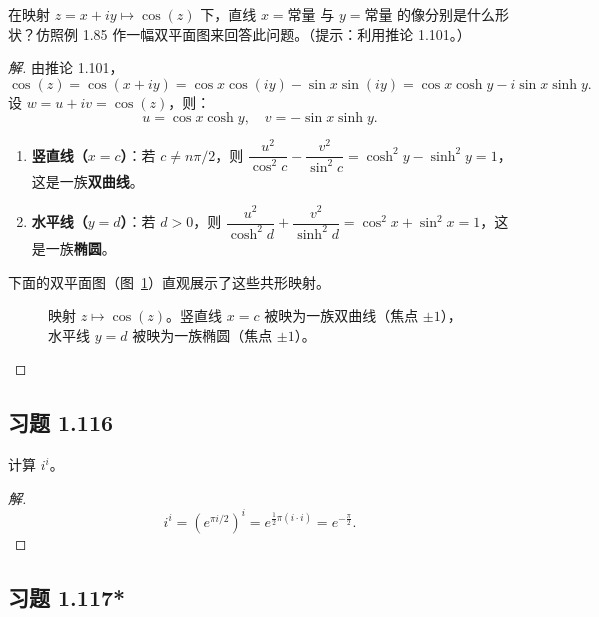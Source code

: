 \documentclass[11pt,a4paper]{article}
\theoremstyle{definition}
\newenvironment{solution}{\begin{proof}[解]}{\end{proof}}
\begin{document}
在映射 $z = x + iy \mapsto \cos(z)$ 下，直线 $x = \text{常量}$ 与 $y = \text{常量}$ 的像分别是什么形状？仿照例 1.85 作一幅双平面图来回答此问题。（提示：利用推论 1.101。）

\begin{solution}
由推论 1.101，
\[
  \cos(z) = \cos(x + iy) = \cos x \cos(iy) - \sin x \sin(iy) = \cos x \cosh y - i \sin x \sinh y.
\]
设 $w = u + iv = \cos(z)$，则：
\[
  u = \cos x \cosh y, \quad v = -\sin x \sinh y.
\]

\begin{enumerate}
  \item \textbf{竖直线（$x = c$）}：若 $c \neq n\pi/2$，则 $\dfrac{u^2}{\cos^2 c} - \dfrac{v^2}{\sin^2 c} = \cosh^2 y - \sinh^2 y = 1$，这是一族\textbf{双曲线}。
  \item \textbf{水平线（$y = d$）}：若 $d > 0$，则 $\dfrac{u^2}{\cosh^2 d} + \dfrac{v^2}{\sinh^2 d} = \cos^2 x + \sin^2 x = 1$，这是一族\textbf{椭圆}。
\end{enumerate}

下面的双平面图（图~\ref{fig:mapping_cos}）直观展示了这些共形映射。

\begin{figure}[htbp]
  \centering
  \resizebox{0.9\textwidth}{!}{}
  \caption{映射 $z \mapsto \cos(z)$。竖直线 $x=c$ 被映为一族双曲线（焦点 $\pm 1$），水平线 $y=d$ 被映为一族椭圆（焦点 $\pm 1$）。}
  \label{fig:mapping_cos}
\end{figure}
\end{solution}

\subsection{习题 1.116}

计算 $i^i$。

\begin{solution}
\[
  i^i = (e^{\pi i / 2})^{i} = e^{\frac{1}{2} \pi (i \cdot i)} =
  e^{-\frac{\pi}{2}}.
\]
\end{solution}

\subsection{习题 1.117*}
\end{document}
